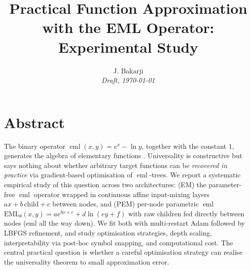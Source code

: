 \documentclass[11pt]{article}
\title{Practical Function Approximation with the EML Operator:\\
Experimental Study}
\author{J. Bakarji \\ \textit{Draft, \today}}
\date{}
\newcommand{\eml}{\operatorname{eml}}
\begin{document}
\maketitle

\section*{Abstract}
The binary operator $\eml(x,y) = e^x - \ln y$, together with the constant $1$,
generates the algebra of elementary functions \cite{odrzywolek2026}. Universality
is constructive but says nothing about whether arbitrary target functions can
be \emph{recovered in practice} via gradient-based optimisation of $\eml$-trees.
We report a systematic empirical study of this question across two
architectures: (EM) the parameter-free $\eml$ operator wrapped in continuous
affine input-mixing layers $a x + b\,\text{child} + c$ between nodes, and
(PEM) per-node parametric $\eml$
$\mathrm{EML}_\theta(x, y) = a e^{bx+c} + d \ln(ey+f)$ with raw children
fed directly between nodes (eml all the way down). We fit both with
multi-restart Adam followed by LBFGS refinement, and study optimisation
strategies, depth scaling, interpretability via post-hoc symbol snapping,
and computational cost. The central practical question is whether a careful
optimisation strategy can realise the universality theorem to small
approximation error.
\end{document}
